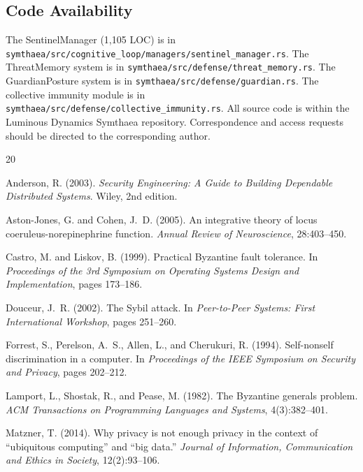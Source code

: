 \documentclass[11pt,a4paper]{article}
\begin{document}
\subsection*{Code Availability}

The SentinelManager (1,105 LOC) is in \texttt{symthaea/src/cognitive\_loop/managers/sentinel\_manager.rs}. The ThreatMemory system is in \texttt{symthaea/src/defense/threat\_memory.rs}. The GuardianPosture system is in \texttt{symthaea/src/defense/guardian.rs}. The collective immunity module is in \texttt{symthaea/src/defense/collective\_immunity.rs}. All source code is within the Luminous Dynamics Symthaea repository. Correspondence and access requests should be directed to the corresponding author.


\begin{thebibliography}{20}

Anderson, R. (2003).
\newblock \emph{Security Engineering: A Guide to Building Dependable Distributed Systems}.
\newblock Wiley, 2nd edition.

Aston-Jones, G. and Cohen, J.~D. (2005).
\newblock An integrative theory of locus coeruleus-norepinephrine function.
\newblock \emph{Annual Review of Neuroscience}, 28:403--450.

Castro, M. and Liskov, B. (1999).
\newblock Practical Byzantine fault tolerance.
\newblock In \emph{Proceedings of the 3rd Symposium on Operating Systems Design and Implementation}, pages 173--186.

Douceur, J.~R. (2002).
\newblock The Sybil attack.
\newblock In \emph{Peer-to-Peer Systems: First International Workshop}, pages 251--260.

Forrest, S., Perelson, A.~S., Allen, L., and Cherukuri, R. (1994).
\newblock Self-nonself discrimination in a computer.
\newblock In \emph{Proceedings of the IEEE Symposium on Security and Privacy}, pages 202--212.

Lamport, L., Shostak, R., and Pease, M. (1982).
\newblock The Byzantine generals problem.
\newblock \emph{ACM Transactions on Programming Languages and Systems}, 4(3):382--401.

Matzner, T. (2014).
\newblock Why privacy is not enough privacy in the context of ``ubiquitous computing'' and ``big data.''
\newblock \emph{Journal of Information, Communication and Ethics in Society}, 12(2):93--106.


\end{thebibliography}
\end{document}
